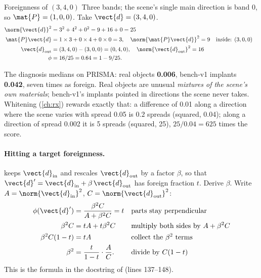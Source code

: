 \begin{worked}[label={we:benchmarks:foreign}]{Foreignness of $(3, 4, 0)$}
Three bands; the scene's single main direction is band 0, so $\mat{P} = (1, 0, 0)$. Take $\vect{d} = (3, 4, 0)$.
\begin{align*}
\norm{\vect{d}}^2 &= 3^2 + 4^2 + 0^2 = 9 + 16 + 0 = 25\\
\mat{P}\vect{d} &= 1 \times 3 + 0 \times 4 + 0 \times 0 = 3, \quad \norm{\mat{P}\vect{d}}^2 = 9 && \text{inside: } (3, 0, 0)\\
\vect{d}_{\text{out}} &= (3, 4, 0) - (3, 0, 0) = (0, 4, 0), \quad \norm{\vect{d}_{\text{out}}}^2 = 16\\
\phi &= 16 / 25 = 0.64 = 1 - 9/25.
\end{align*}
\end{worked}

The diagnosis medians on PRISMA\hfil{}\hfilneg{}: real objects
\textbf{0.006}, bench-v1 implants \textbf{0.042}, seven times as foreign. Real objects are unusual \emph{mixtures of
the scene's own materials}; bench-v1's implants pointed in directions the scene never takes. Whitening (\cref{ch:rx})
rewards exactly that: a difference of 0.01 along a direction where the scene varies with spread 0.05 is $0.2$ spreads
(squared, 0.04); along a direction of spread 0.002 it is 5 spreads (squared, 25), $25/0.04 = 625$ times the score.

\paragraph{Hitting a target foreignness.}  keeps $\vect{d}_{\text{in}}$ and rescales
$\vect{d}_{\text{out}}$ by a factor $\beta$, so that $\vect{d}' = \vect{d}_{\text{in}} + \beta\,\vect{d}_{\text{out}}$
has foreign fraction $t$. Derive $\beta$. Write $A = \norm{\vect{d}_{\text{in}}}^2$, $C = \norm{\vect{d}_{\text{out}}}^2$:
\begin{align*}
\phi(\vect{d}') &= \frac{\beta^2 C}{A + \beta^2 C} = t && \text{parts stay perpendicular}\\
\beta^2 C &= t A + t \beta^2 C && \text{multiply both sides by } A + \beta^2 C\\
\beta^2 C (1 - t) &= t A && \text{collect the } \beta^2 \text{ terms}\\
\beta^2 &= \frac{t}{1 - t} \cdot \frac{A}{C}. && \text{divide by } C(1 - t)
\end{align*}
This is the formula in the docstring of  (lines 137--148).

